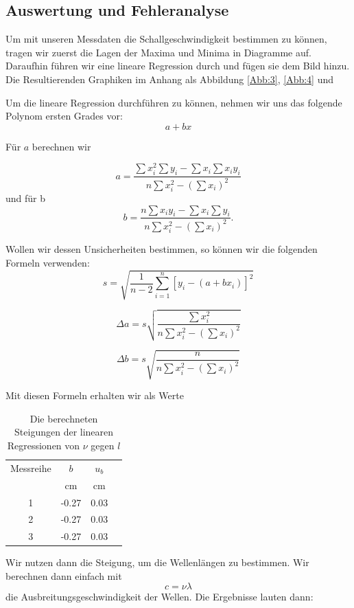 \documentclass[11pt,a4paper]{article}
\begin{document}
\subsection{Auswertung und Fehleranalyse}

Um mit unseren Messdaten die Schallgeschwindigkeit bestimmen zu k\"onnen, tragen wir zuerst die Lagen der Maxima und Minima in Diagramme auf. Daraufhin f\"uhren wir eine lineare Regression durch und f\"ugen sie dem Bild hinzu. Die Resultierenden Graphiken im Anhang als Abbildung \ref{Abb:3}, \ref{Abb:4} und %

Um die lineare Regression durchf\"uhren zu k\"onnen, nehmen wir uns das folgende Polynom ersten Grades vor:
\[ a+bx\]

F\"ur $a$ berechnen wir

\[a=\frac{\sum x_i^2\sum y_i-\sum x_i\sum x_iy_i}{n\sum x_i^2-(\sum x_i)^2}\]
und f\"ur b
\[b=\frac{n\sum x_iy_i-\sum x_i\sum y_i}{n\sum x_i^2-(\sum x_i)^2}.\]

Wollen wir dessen Unsicherheiten bestimmen, so k\"onnen wir die folgenden Formeln verwenden:
\[
s=\sqrt{\frac{1}{n-2}\sum^n_{i=1}[y_i-(a+bx_i)]^2}\]

\[\Delta a=s\sqrt{\frac{\sum x_i^2}{n\sum x_i^2-(\sum x_i)^2}}\]

\[\Delta b=s\sqrt{\frac{n}{n\sum x_i^2-(\sum x_i)^2}}\]

Mit diesen Formeln erhalten wir als Werte

\begin{table}[h]
	\centering
	\begin{tabular*}{0.50\textwidth}{@{\extracolsep{\fill}}cccc}
		\toprule
		Messreihe & $b$ & $u_b$ \\
		& cm & cm\\
		1 & -0.27 & 0.03\\
		2 & -0.27 & 0.03\\
		3 & -0.27 & 0.03\\
		\bottomrule
	\end{tabular*}
\caption{Die berechneten Steigungen der linearen Regressionen von $\nu$ gegen $l$}
\label{Table1}
\end{table}

Wir nutzen dann die Steigung, um die Wellenl\"angen zu bestimmen. Wir berechnen dann einfach mit
\begin{equation}
c=\nu\lambda
\end{equation}
die Ausbreitungsgeschwindigkeit der Wellen. Die Ergebnisse lauten dann:
\end{document}
